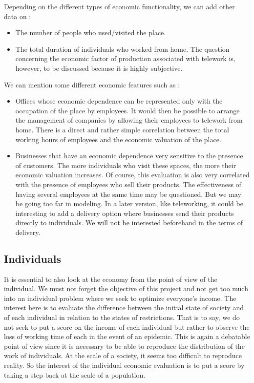Depending on the different types of economic functionality, we can add other data on :\\

\begin{itemize} 
\item The number of people who used/visited the place.
\item The total duration of individuals who worked from home. The question concerning the economic factor of production associated with telework is, however, to be discussed because it is highly subjective.\\
\end{itemize}

We can mention some different economic features such as :\\

\begin{itemize}
\item Offices whose economic dependence can be represented only with the occupation of the place by employees. It would then be possible to arrange the management of companies by allowing their employees to telework from home. There is a direct and rather simple correlation between the total working hours of employees and the economic valuation of the place.
\item Businesses that have an economic dependence very sensitive to the presence of customers. The more individuals who visit these spaces, the more their economic valuation increases. Of course, this evaluation is also very correlated with the presence of employees who sell their products. The effectiveness of having several employees at the same time may be questioned. But we may be going too far in modeling. In a later version, like teleworking, it could be interesting to add a delivery option where businesses send their products directly to individuals. We will not be interested beforehand in the terms of delivery.\\
\end{itemize}

\subsection{Individuals}

It is essential to also look at the economy from the point of view of the individual. We must not forget the objective of this project and not get too much into an individual problem where we seek to optimize everyone's income. The interest here is to evaluate the difference between the initial state of society and of each individual in relation to the states of restrictions. That is to say, we do not seek to put a score on the income of each individual but rather to observe the loss of working time of each in the event of an epidemic. This is again a debatable point of view since it is necessary to be able to reproduce the distribution of the work of individuals. At the scale of a society, it seems too difficult to reproduce reality. So the interest of the individual economic evaluation is to put a score by taking a step back at the scale of a population.\\

